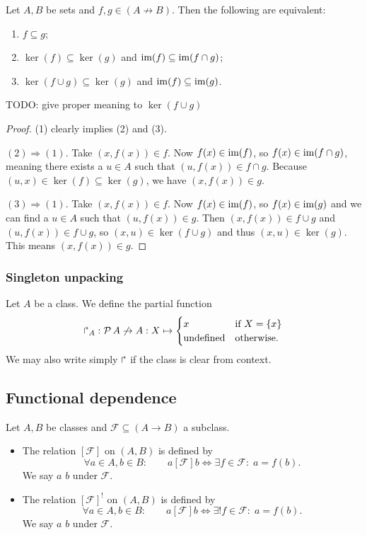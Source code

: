 \begin{proposition} \label{partialFunctionSubset}
Let $A,B$ be sets and $f,g\in(A\not\to B)$. Then the following are equivalent:
\begin{enumerate}
\item $f\subseteq g$;
\item $\ker(f) \subseteq \ker(g)$ and $\operatorname{im}(f)\subseteq \operatorname{im}(f\cap g)$;
\item $\ker(f\cup g) \subseteq \ker(g)$ and $\operatorname{im}(f)\subseteq \operatorname{im}(g)$.
\end{enumerate}
TODO: give proper meaning to $\ker(f\cup g)$
\end{proposition}
\begin{proof}
(1) clearly implies (2) and (3).

$(2) \Rightarrow (1)$. Take $(x,f(x)) \in f$. Now $f(x)\in \operatorname{im}(f)$, so $f(x)\in\operatorname{im}(f\cap g)$, meaning there exists a $u\in A$ such that $(u,f(x))\in f\cap g$. Because $(u,x)\in \ker(f)\subseteq \ker(g)$, we have $(x,f(x))\in g$.

$(3) \Rightarrow (1)$. Take $(x,f(x)) \in f$. Now $f(x)\in \operatorname{im}(f)$, so $f(x)\in\operatorname{im}(g)$ and we can find a $u\in A$ such that $(u,f(x))\in g$. Then $(x,f(x)) \in f\cup g$ and $(u,f(x))\in f\cup g$, so $(x,u)\in \ker(f\cup g)$ and thus $(x,u)\in\ker(g)$. This means $(x,f(x))\in g$.
\end{proof}

\subsubsection{Singleton unpacking}
\begin{definition}
Let $A$ be a class. We define the partial function
\[ \operatorname{\Rsh}_A: \operatorname{\mathcal{P}}{A} \not\to A: X \mapsto \begin{cases}
x & \text{if $X = \{x\}$} \\
\text{undefined} & \text{otherwise}.
\end{cases} \]
We may also write simply $\operatorname{\Rsh}$ if the class is clear from context.
\end{definition}

\subsection{Functional dependence}
\begin{definition}
Let $A,B$ be classes and $\mathcal{F} \subseteq (A\to B)$ a subclass.
\begin{itemize}
\item The relation $[\mathcal{F}]$ on $(A,B)$ is defined by
\[ \forall a\in A, b\in B: \qquad a[\mathcal{F}]b \iff \exists f\in \mathcal{F}: \; a = f(b). \]
We say $a$  $b$ under $\mathcal{F}$.
\item The relation $[\mathcal{F}]^!$ on $(A,B)$ is defined by
\[ \forall a\in A, b\in B: \qquad a[\mathcal{F}]b \iff \exists! f\in \mathcal{F}: \; a = f(b). \]
We say $a$  $b$ under $\mathcal{F}$.
\end{itemize}
\end{definition}

